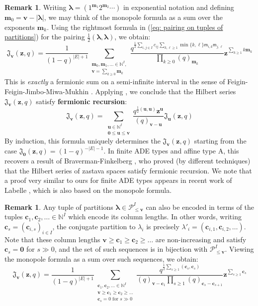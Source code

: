 \documentclass[11pt,reqno]{amsart}
\renewcommand{\mathbf}{\mathbold}
\numberwithin{equation}{section}
\theoremstyle{definition}
\newtheorem{Remark}[equation]{Remark}
\newcommand{\fJ}{\mathfrak{J}}
\newcommand{\cP}{\mathcal{P}}
\newcommand{\bc}{\mathbf{c}}
\newcommand{\bm}{\mathbf{m}}
\newcommand{\bu}{\mathbf{u}}
\newcommand{\bv}{\mathbf{v}}
\newcommand{\bz}{\mathbf{z}}
\newcommand{\NN}{\mathbb{N}}
\renewcommand{\bv}{\mathbf{v}} %
\newcommand{\sm}{\mathsf{m}}
\newcommand{\vertexset}{I}
\newcommand{\arrowset}{E}
\newcommand{\Partitions}{\cP}
\newcommand{\la}{\lambda}
\newcommand{\bla}{{\boldsymbol{\lambda}}}
\begin{document}
\begin{Remark}
Writing $\bla = (1^{\bm_1} 2^{\bm_2} \cdots)$ in exponential notation and defining $\bm_0 = \bv - |\bla|$, we may think of the monopole formula as a sum over the exponents $\bm_k$.  Using the rightmost formula in (\ref{eq: pairing on tuples of partitions}) for the pairing  $\tfrac{1}{2} (\bla,\bla)$, we obtain:
$$
    \fJ_\bv(\bz, q) = \frac{1}{(1-q)^{|\arrowset|+1}}  \sum_{\substack{\bm_0, \bm_1, \ldots \in \NN^\vertexset, \\  \bv =\sum_{k\geq 0}  \bm_k }} \frac{q^{\tfrac{1}{2} \sum_{i,j\in \vertexset} c_{ij} \sum_{k,\ell \geq 1} \min\{ k,\ell\} \sm_{i,k} \sm_{j,\ell}}}{\prod_{k \geq 0} (q)_{\bm_k}}  \bz^{{\sum_{k\geq 1} k \bm_k}}
$$
This is \emph{exactly} a {fermionic sum} on a semi-infinite interval in the sense of Feigin-Feigin-Jimbo-Miwa-Mukhin \cite[\S 2.2]{FFJMM}.	  Applying \cite[Proposition 2.4]{FFJMM}, we conclude that the Hilbert series $\fJ_\bv(\bz,q)$ satisfy \textbf{fermionic recursion}:
$$
\fJ_\bv(\bz,q) = \sum_{\substack{\bu \in \NN^\vertexset \\ \mathbf{0} \leq \mathbf{u} \leq \bv}} \frac{q^{\frac{1}{2}(\mathbf{u}, \mathbf{u})} \bz^{\mathbf{u}}}{(q)_{\bv - \bu}} \fJ_{\mathbf{u}}(\bz,q)
$$
By induction, this formula uniquely determines the $\fJ_\bv(\bz, q)$ starting from the case $\fJ_{\mathbf{0}}(\bz,q) = (1-q)^{-|\arrowset|-1}$. 
In finite ADE types and affine type A, this recovers a result of Braverman-Finkelberg \cite{BF3}, who proved (by different techniques) that the Hilbert series of zastava spaces satisfy fermionic recursion.  We note that a proof very similar to ours for finite ADE types appears in recent work of Labelle \cite[Thm.~2.1]{Labelle}, which is also based on the monopole formula.
\end{Remark}

\begin{Remark}
    Any tuple of partitions $\bla \in \Partitions_{\leq \bv}^\vertexset$ can also be encoded in terms of the tuples $\bc_1, \bc_2,\ldots \in \NN^\vertexset$ which encode its column lengths.  In other words, writing $\bc_s = (\bc_{i,s})_{i \in \vertexset}$, the conjugate partition to $\la_i$ is precisely $\la'_i = (\bc_{i,1}, \bc_{i,2},\ldots)$.  Note that these column lengths  $\bv \geq \bc_1 \geq \bc_2 \geq \ldots$ are non-increasing and satisfy $ \bc_s = \mathbf{0}$ for $s \gg 0$,    and the set of such sequences is in bijection with  $\Partitions_{\leq \bv}^\vertexset$.   Viewing the monopole formula as a sum over such sequences, we obtain:
    $$
        \fJ_\bv(\bz,q) = \frac{1}{(1-q)^{|\arrowset|+1}} \sum_{\substack{\bc_1,\bc_2,\ldots \in \NN^\vertexset \\ \bv \geq \bc_1 \geq \bc_2 \geq \ldots \\ \bc_s =0 \text{ for } s \gg 0 }} \frac{q^{\frac{1}{2} \sum_{s \geq 1} (\bc_s, \bc_s)}}{(q)_{\bv - \bc_1} \prod_{s \geq 1} (q)_{\bc_s - \bc_{s+1}}} \bz^{\sum_{s\geq 1} \bc_s}
    $$
\end{Remark}
\end{document}
